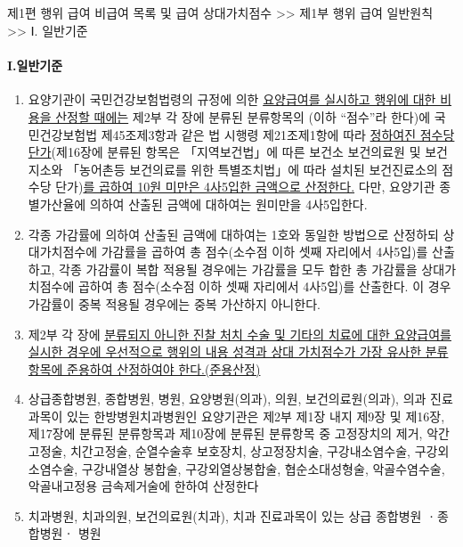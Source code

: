 \subsection{}
\begin{mdframed}[linecolor=blue,middlelinewidth=2]
제1편 행위 급여 \cntrdot{}  비급여 목록 및 급여 상대가치점수 >> 제1부 행위 급여 일반원칙 >> Ⅰ. 일반기준
\end{mdframed}

\paragraph{I.일반기준}
\begin{enumerate}[1.]\tightlist
\item 요양기관이 국민건강보험법령의 규정에 의한 \uline{요양급여를 실시하고 행위에 대한 비용을 산정할 때에는} 제2부 각 장에 분류된 분류항목의 (이하 “점수”라 한다)에 국민건강보험법 제45조제3항과 같은 법 시행령 제21조제1항에 따라 \uline{정하여진 점수당 단가}(제16장에 분류된 항목은 「지역보건법」에 따른 보건소\cntrdot{} 보건의료원 및 보건지소와 「농어촌등 보건의료를 위한 특별조치법」에 따라 설치된 보건진료소의 점수당 단가)\uline{를 곱하여 10원 미만은 4사5입한 금액으로 산정한다.} 다만, 요양기관 종별가산율에 의하여 산출된 금액에 대하여는 원미만을 4사5입한다.
\item 각종 가감률에 의하여 산출된 금액에 대하여는 1호와 동일한 방법으로 산정하되 상대가치점수에 가감률을 곱하여 총 점수(소수점 이하 셋째 자리에서 4사5입)를 산출하고, 각종 가감률이 복합 적용될 경우에는 가감률을 모두 합한 총 가감률을 상대가치점수에 곱하여 총 점수(소수점 이하 셋째 자리에서 4사5입)를 산출한다. 이 경우 가감률이 중복 적용될 경우에는 중복 가산하지 아니한다.
\item 제2부 각 장에 \uline{분류되지 아니한 진찰\cntrdot{} 처치\cntrdot{} 수술 및 기타의 치료에 대한 요양급여를 실시한 경우에 우선적으로 행위의 내용\cntrdot{} 성격과 상대 가치점수가 가장 유사한 분류항목에 준용하여 산정하여야 한다.(준용산정)}
\item 상급종합병원, 종합병원, 병원, 요양병원(의과), 의원, 보건의료원(의과), 의과 진료과목이 있는 한방병원\cntrdot{}치과병원인 요양기관은 제2부 제1장 내지 제9장 및 제16장, 제17장에 분류된 분류항목과 제10장에 분류된 분류항목 중 고정장치의 제거, 악간고정술, 치간고정술, 순열수술후
보호장치, 상고정장치술, 구강내소염수술, 구강외소염수술, 구강내열상 봉합술, 구강외열상봉합술, 협순소대성형술, 악골수염수술, 악골내고정용 금속제거술에 한하여 산정한다
\item 치과병원, 치과의원, 보건의료원(치과), 치과 진료과목이 있는 상급 종합병원 ㆍ종합병원ㆍ 병원

\end{enumerate}
